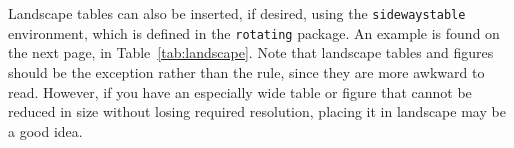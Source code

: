 Landscape tables can also be inserted, if desired, using the \verb-sidewaystable- environment, which is defined in the \verb!rotating! package. An example is found on the next page, in Table~\ref{tab:landscape}. Note that landscape tables and figures should be the exception rather than the rule, since they are more awkward to read. However, if you have an especially wide table or figure that cannot be reduced in size without losing required resolution, placing it in landscape may be a good idea.
\begin{sidewaystable}
\centering
{}
\ifdim\wd\tempbox<\TPTminimum\relax \tempwidth=\TPTminimum\relax
\else\tempwidth=\wd\tempbox
\fi
\begin{minipage}{\tempwidth}\centering
\caption{A landscape table}\vspace*{6pt}
\label{tab:landscape}
\usebox{\tempbox}
\end{minipage}
\end{sidewaystable}